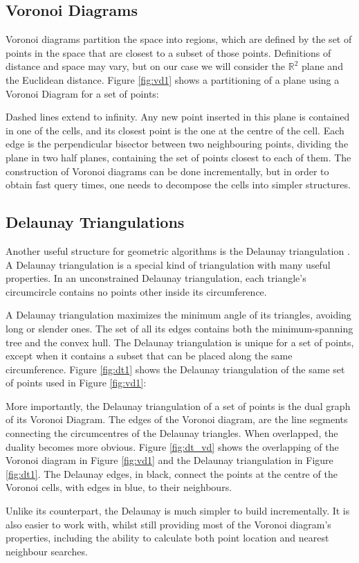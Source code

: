 \subsection{Voronoi Diagrams}
Voronoi diagrams \cite{tricard2} partition the space into regions, which are defined by the set of points in the space that are closest to a subset of those points. Definitions of distance and space may vary, but on our case we will consider the $\mathbb{R}^2$ plane and the Euclidean distance.
Figure \ref{fig:vd1} shows a partitioning of a plane using a Voronoi Diagram for a set of points:

\noindent
Dashed lines extend to infinity. Any new point inserted in this plane is contained in one of the cells, and its closest point is the one at the centre of the cell.
Each edge is the perpendicular bisector between two neighbouring points, dividing the plane in two half planes, containing the set of points closest to each of them.
The construction of Voronoi diagrams can be done incrementally, but in order to obtain fast query times, one needs to decompose the cells into simpler structures. 
\subsection{Delaunay Triangulations}
Another useful structure for geometric algorithms is the Delaunay triangulation \cite{tricard2}.
A Delaunay triangulation \cite{delbible} is a special kind of triangulation with many useful properties. 
In an unconstrained Delaunay triangulation, each triangle's circumcircle contains no points other inside its circumference.

A Delaunay triangulation maximizes the minimum angle of its triangles, avoiding long or slender ones.
The set of all its edges contains both the minimum-spanning tree and the convex hull.
The Delaunay triangulation is unique for a set of points, except when it contains a subset that can be placed along the same circumference. Figure \ref{fig:dt1} shows the Delaunay triangulation of the same set of points used in Figure \ref{fig:vd1}:

\noindent
More importantly, the Delaunay triangulation of a set of points is the dual graph of its Voronoi Diagram. The edges of the Voronoi diagram, are the line segments connecting the circumcentres of the Delaunay triangles. When overlapped, the duality becomes more obvious. Figure \ref{fig:dt_vd} shows the overlapping of the Voronoi diagram in Figure \ref{fig:vd1} and the Delaunay  triangulation in Figure \ref{fig:dt1}. The Delaunay edges, in black, connect the points at the centre of the Voronoi cells, with edges in blue, to their neighbours.

\noindent
Unlike its counterpart, the Delaunay is much simpler to build incrementally. It is also easier to work with, whilst still providing most of the Voronoi diagram's properties, including the ability to calculate both point location and nearest neighbour searches.
